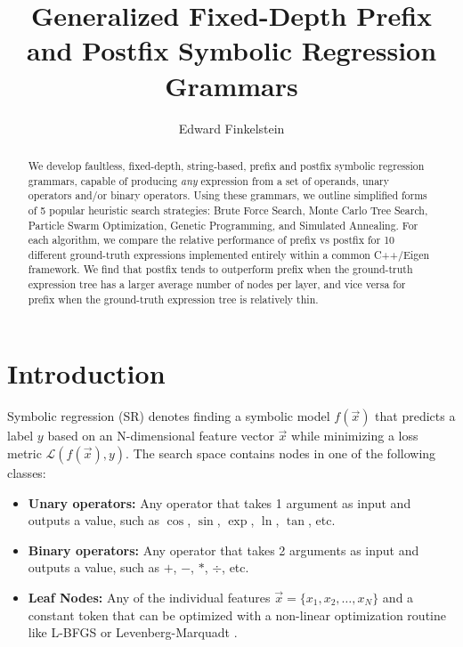 \documentclass[runningheads]{llncs}
\begin{document}
%
\title{Generalized Fixed-Depth Prefix and Postfix Symbolic Regression Grammars}%
%
%
\author{Edward Finkelstein}%
%
%
%
\maketitle              %
%
\begin{abstract}
We develop faultless, fixed-depth, string-based, prefix and postfix symbolic regression grammars, capable of producing \emph{any} expression from a set of operands, unary operators and/or binary operators. Using these grammars, we outline simplified forms of 5 popular heuristic search strategies: Brute Force Search, Monte Carlo Tree Search, Particle Swarm Optimization, Genetic Programming, and Simulated Annealing. For each algorithm, we compare the relative performance of prefix vs postfix for 10 different ground-truth expressions implemented entirely within a common C++/Eigen framework. We find that postfix tends to outperform prefix when the ground-truth expression tree has a larger average number of nodes per layer, and vice versa for prefix when the ground-truth expression tree is relatively thin.

\end{abstract}

\section{Introduction}
Symbolic regression (SR) denotes finding a symbolic model $f\left(\vec{x}\right)$ that predicts a label $y$ based on an N-dimensional feature vector $\vec{x}$ while minimizing a loss metric $\mathcal{L}\left(f\left(\vec{x}\right),y\right)$. The search space contains nodes in one of the following classes:
\begin{itemize}
\item \textbf{Unary operators: } Any operator that takes 1 argument as input and outputs a value, such as $\cos$, $\sin$, $\exp$, $\ln$, $\tan$, etc.
\item \textbf{Binary operators: } Any operator that takes 2 arguments as input and outputs a value, such as $+$, $-$, $*$, $\div$, etc.
\item \textbf{Leaf Nodes: } Any of the individual features $\vec{x} = \{x_1, x_2, \ldots,x_{N}\}$ and a constant token that can be optimized with a non-linear optimization routine like L-BFGS \cite{doi:10.1137/0916069} or Levenberg-Marquadt \cite{83b09f23-b20e-3617-8f72-24765b713f7b} \cite{doi:10.1137/0111030}.
\end{itemize}
\end{document}
